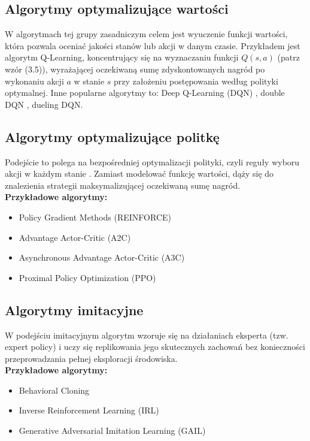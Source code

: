 \documentclass[a4paper, 12pt]{article}
\numberwithin{equation}{section}
\begin{document}
    \subsection{Algorytmy optymalizujące wartości}
    W algorytmach tej grupy zasadniczym celem jest wyuczenie funkcji wartości, która pozwala oceniać jakości stanów lub akcji w danym czasie. Przykładem jest algorytm Q-Learning, koncentrujący się na wyznaczaniu funkcji \( Q(s,a) \) (patrz wzór (3.5)), wyrażającej oczekiwaną sumę zdyskontowanych nagród po wykonaniu akcji \( a \) w stanie \( s \) przy założeniu postępowania według polityki optymalnej. Inne popularne algorytmy to: Deep Q-Learning (DQN) \cite{mnih2015dqn}, double DQN \cite{vanhasselt2016deep}, dueling DQN. \cite{wang2016dueling}
    \subsection{Algorytmy optymalizujące politkę}
    Podejście to polega na bezpośredniej optymalizacji polityki, czyli reguły wyboru akcji w każdym stanie \cite{sutton2018rl}. Zamiast modelować funkcję wartości, dąży się do znalezienia strategii maksymalizującej oczekiwaną sumę nagród.
    \\ \textbf{Przykładowe algorytmy:}
    \begin{itemize}
        \item Policy Gradient Methods (REINFORCE) \cite{williams1992simple}
        \item Advantage Actor-Critic (A2C) \cite{konda2000actor}
        \item Asynchronous Advantage Actor-Critic (A3C) \cite{mnih2016a3c}
        \item Proximal Policy Optimization (PPO) \cite{schulman2017proximal}
    \end{itemize}
    \subsection{Algorytmy imitacyjne}
    W podejściu imitacyjnym algorytm wzoruje się na działaniach eksperta (tzw. expert policy) i uczy się replikowania jego skutecznych zachowań bez konieczności przeprowadzania pełnej eksploracji środowiska.
    \\ \textbf{Przykładowe algorytmy:}
    \begin{itemize}
        \item Behavioral Cloning \cite{bain1995framework}
        \item Inverse Reinforcement Learning (IRL) \cite{ng2000algorithms}
        \item Generative Adversarial Imitation Learning (GAIL) \cite{ho2016generative}
    \end{itemize}
\end{document}

